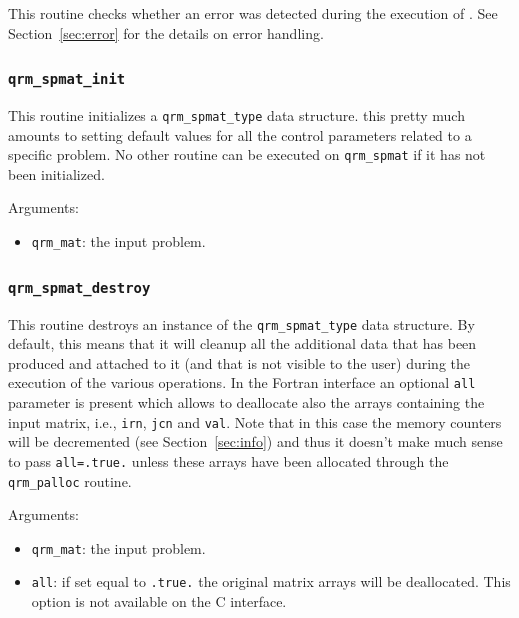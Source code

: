 \documentclass[11pt]{article}
\begin{document}
This routine checks whether an error was detected during the execution
of \qrm. See Section~\ref{sec:error} for the details on error handling.



\subsubsection{\texttt{qrm\_spmat\_init}}
This routine initializes a \texttt{qrm\_spmat\_type} data structure. this
pretty much amounts to setting default values for all the control
parameters related to a specific problem. No other routine can be
executed on \texttt{qrm\_spmat} if it has not been initialized.


\noindent Arguments:
\begin{itemize}
\item \texttt{qrm\_mat}: the input problem.
\end{itemize}

\subsubsection{\texttt{qrm\_spmat\_destroy}}
This routine destroys an instance of the \texttt{qrm\_spmat\_type} data
structure. By default, this means that it will cleanup all the
additional data that has been produced and attached to it (and that is
not visible to the user) during the execution of the various \qrm
operations. In the Fortran interface an optional \texttt{all}
parameter is present which allows to deallocate also the arrays
containing the input matrix, i.e., \texttt{irn}, \texttt{jcn} and
\texttt{val}. Note that in this case the memory counters will be
decremented (see Section~\ref{sec:info}) and thus it doesn't make much
sense to pass \texttt{all=.true.} unless these arrays have been
allocated through the \texttt{qrm\_palloc} routine.



\noindent Arguments:
\begin{itemize}
\item \texttt{qrm\_mat}: the input problem.
\item \texttt{all}: if set equal to \texttt{.true.} the original
  matrix arrays will be deallocated. This option is not available on
  the C interface.
\end{itemize}
\end{document}

